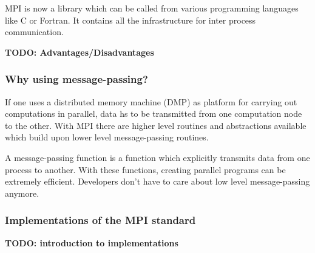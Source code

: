 MPI is now a library which can be called from various programming
languages like C or Fortran. It contains all the infrastructure for
inter process communication.

\textbf{TODO: Advantages/Disadvantages}

\subsubsection{Why using message-passing?}
\label{sec:why_m-p}

If one uses a distributed memory machine (DMP) as platform for
carrying out computations in parallel, data hs to be transmitted from
one computation node to the other. With MPI there are higher level
routines and abstractions available which build upon lower level
message-passing routines.
  
A message-passing function is a function which explicitly transmits
data from one process to another. With these
functions, creating parallel programs can be extremely
efficient. Developers don't have to care about low level
message-passing anymore.

\subsubsection{Implementations of the MPI standard}

\textbf{TODO: introduction to implementations}

